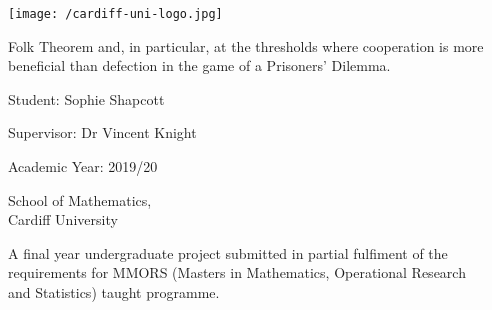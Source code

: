\begin{titlepage}
	\begin{center}
		\vspace*{0.5cm}
		\texttt{[image: /cardiff-uni-logo.jpg]}

		\vspace{1cm}

		\huge
		Folk Theorem and, in particular, at the thresholds where cooperation is more beneficial than defection in the game of a 		Prisoners' Dilemma.

		\vspace{2cm}

		\large
		Student: Sophie Shapcott

		\vspace{0.5cm}

		Supervisor: Dr Vincent Knight

		\vspace{0.5cm}

		Academic Year: 2019/20
		
		\vspace{0.5cm}

		School of Mathematics, \\Cardiff University

		\vfill

		\normalsize
		A final year undergraduate project submitted in partial fulfiment of the\\ requirements for MMORS (Masters in Mathematics, Operational Research\\ and Statistics) taught programme.

	\end{center}
\end{titlepage}
